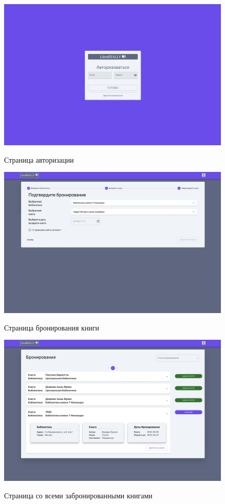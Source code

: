 \begin{figure}[H]
	\begin{center}
		{\includegraphics[scale = 0.25]{../img/design/login.png}}
		\caption{Страница авторизации}
		\label{fig:design-auth}
	\end{center}
\end{figure} 

\begin{figure}[H]
	\begin{center}
		{\includegraphics[scale = 0.25]{../img/design/reserv.png}}
		\caption{Страница бронирования книги}
		\label{fig:design-reserv}
	\end{center}
\end{figure}

\begin{figure}[H]
	\begin{center}
		{\includegraphics[scale = 0.25]{../img/design/all-reservs.png}}
		\caption{Страница со всеми забронированными книгами}
		\label{fig:design-all-reservs}
	\end{center}
\end{figure}
